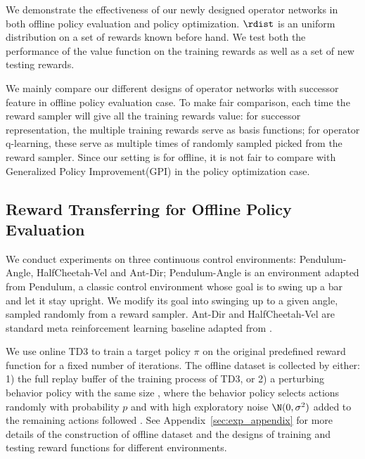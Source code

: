 We demonstrate the effectiveness of our newly designed operator networks in both offline policy evaluation and policy optimization.
$\rdist$ is an uniform distribution on a set of rewards known before hand.
We test both the performance of the value function on the training rewards as well as a set of new testing rewards.

We mainly compare our different designs of operator networks with successor feature \citep{barreto2017successor} in offline policy evaluation case.
To make fair comparison, each time the reward sampler will give all the training rewards value: for successor representation, the multiple training rewards serve as basis functions; for operator q-learning, these serve as multiple times of randomly sampled picked from the reward sampler.
Since our setting is for offline, it is not fair to compare with Generalized Policy Improvement(GPI) in the policy optimization case.

\subsection{Reward Transferring for Offline Policy Evaluation}
We conduct experiments on three continuous control environments: Pendulum-Angle, HalfCheetah-Vel and Ant-Dir;
Pendulum-Angle is an environment adapted from Pendulum, a classic control environment whose goal is to swing up a bar and let it stay upright. 
We modify its goal into swinging up to a given angle, sampled randomly from a reward sampler.
Ant-Dir and HalfCheetah-Vel are standard meta reinforcement learning baseline adapted from \citet{finn2017model}.

We use online TD3 \citep{fujimoto2018addressing} to train a target policy $\pi$ on the original predefined reward function for a fixed number of iterations.
The offline dataset is collected by either: 1) the full replay buffer of the training process of TD3, or 2) a perturbing behavior policy with the same size , where the behavior policy selects actions randomly with probability $p$ and with high exploratory noise $\N(0, \sigma^2)$ added to the remaining actions followed \citet{fujimoto2019off}. See Appendix~\ref{sec:exp_appendix} for more details of the construction of offline dataset and the designs of training and testing reward functions for different environments. 

